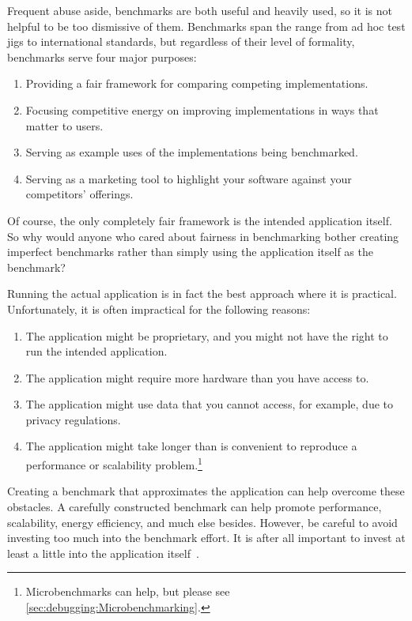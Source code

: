 Frequent abuse aside, benchmarks are both useful and heavily used,
so it is not helpful to be too dismissive of them.
Benchmarks span the range from ad hoc test jigs to international
standards, but regardless of their level of formality, benchmarks
serve four major purposes:

\begin{enumerate}
\item	Providing a fair framework for comparing competing implementations.
\item	Focusing competitive energy on improving implementations in ways
	that matter to users.
\item	Serving as example uses of the implementations being benchmarked.
\item	Serving as a marketing tool to highlight your software
	against your competitors' offerings.
\end{enumerate}

Of course,  the only completely fair framework is the intended
application itself.
So why would anyone who cared about fairness in benchmarking
bother creating imperfect benchmarks rather than simply
using the application itself as the benchmark?

Running the actual application is in fact the best approach where it is practical.
Unfortunately, it is often impractical for the following reasons:

\begin{enumerate}
\item	The application might be proprietary, and you
	might not have the right to run the intended application.
\item	The application might require more hardware
	than you have access to.
\item	The application might use data that you cannot
	access, for example, due to privacy regulations.
\item	The application might take longer than is convenient to
	reproduce a performance or scalability problem.\footnote{
		Microbenchmarks can help, but
		please see \cref{sec:debugging:Microbenchmarking}.}
\end{enumerate}

Creating a benchmark that approximates
the application can help overcome these obstacles.
A carefully constructed benchmark can help promote performance,
scalability, energy efficiency, and much else besides.
However, be careful to avoid investing too much into the benchmark
effort.
It is after all important to invest at least a little into the
application itself~\cite{Gray91}.

